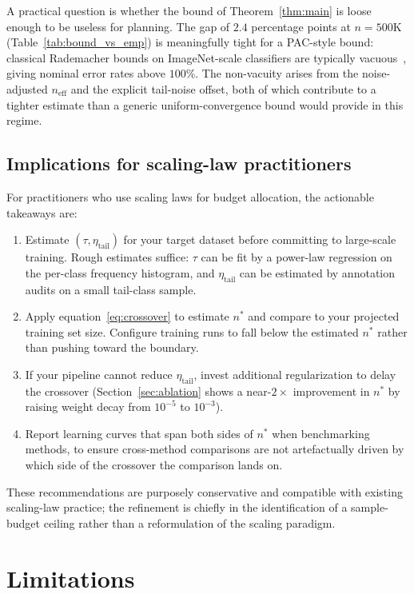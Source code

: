 \documentclass[11pt]{article}
\begin{document}
A practical question is whether the bound of Theorem~\ref{thm:main} is loose enough to be useless for planning. The gap of $2.4$ percentage points at $n = 500\text{K}$ (Table~\ref{tab:bound_vs_emp}) is meaningfully tight for a PAC-style bound: classical Rademacher bounds on ImageNet-scale classifiers are typically vacuous~\cite{dziugaite2017}, giving nominal error rates above $100\%$. The non-vacuity arises from the noise-adjusted $n_{\mathrm{eff}}$ and the explicit tail-noise offset, both of which contribute to a tighter estimate than a generic uniform-convergence bound would provide in this regime.

\subsection{Implications for scaling-law practitioners}

For practitioners who use scaling laws for budget allocation, the actionable takeaways are:
\begin{enumerate}
\item Estimate $(\tau, \eta_{\mathrm{tail}})$ for your target dataset before committing to large-scale training. Rough estimates suffice: $\tau$ can be fit by a power-law regression on the per-class frequency histogram, and $\eta_{\mathrm{tail}}$ can be estimated by annotation audits on a small tail-class sample.
\item Apply equation~\eqref{eq:crossover} to estimate $n^{*}$ and compare to your projected training set size. Configure training runs to fall below the estimated $n^{*}$ rather than pushing toward the boundary.
\item If your pipeline cannot reduce $\eta_{\mathrm{tail}}$, invest additional regularization to delay the crossover (Section~\ref{sec:ablation} shows a near-$2\times$ improvement in $n^{*}$ by raising weight decay from $10^{-5}$ to $10^{-3}$).
\item Report learning curves that span both sides of $n^{*}$ when benchmarking methods, to ensure cross-method comparisons are not artefactually driven by which side of the crossover the comparison lands on.
\end{enumerate}

These recommendations are purposely conservative and compatible with existing scaling-law practice; the refinement is chiefly in the identification of a sample-budget ceiling rather than a reformulation of the scaling paradigm.

\section{Limitations} \label{sec:limitations}
\end{document}
